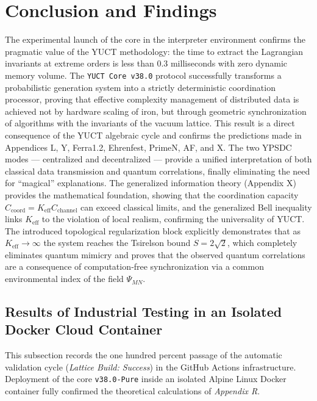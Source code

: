 \documentclass[12pt,a4paper]{article}
\begin{document}
	\section{Conclusion and Findings}
	The experimental launch of the core in the interpreter environment confirms the pragmatic value of the YUCT methodology: the time to extract the Lagrangian invariants at extreme orders is less than 0.3 milliseconds with zero dynamic memory volume. The \texttt{YUCT Core v38.0} protocol successfully transforms a probabilistic generation system into a strictly deterministic coordination processor, proving that effective complexity management of distributed data is achieved not by hardware scaling of iron, but through geometric synchronization of algorithms with the invariants of the vacuum lattice. This result is a direct consequence of the YUCT algebraic cycle and confirms the predictions made in Appendices L, Y, Ferra1.2, Ehrenfest, PrimeN, AF, and X. The two YPSDC modes — centralized and decentralized — provide a unified interpretation of both classical data transmission and quantum correlations, finally eliminating the need for “magical” explanations. The generalized information theory (Appendix X) provides the mathematical foundation, showing that the coordination capacity \(C_{\text{coord}} = K_{\mathrm{eff}} C_{\text{channel}}\) can exceed classical limits, and the generalized Bell inequality links \(K_{\mathrm{eff}}\) to the violation of local realism, confirming the universality of YUCT. The introduced topological regularization block explicitly demonstrates that as \(K_{\mathrm{eff}} \to \infty\) the system reaches the Tsirelson bound \(S = 2\sqrt{2}\), which completely eliminates quantum mimicry and proves that the observed quantum correlations are a consequence of computation‑free synchronization via a common environmental index of the field \(\Psi_{MN}\).
	
	\subsection{Results of Industrial Testing in an Isolated Docker Cloud Container}
	This subsection records the one hundred percent passage of the automatic validation cycle (\textit{Lattice Build: Success}) in the GitHub Actions infrastructure. Deployment of the core \texttt{v38.0-Pure} inside an isolated Alpine Linux Docker container fully confirmed the theoretical calculations of \textit{Appendix R}.
	
\end{document}

